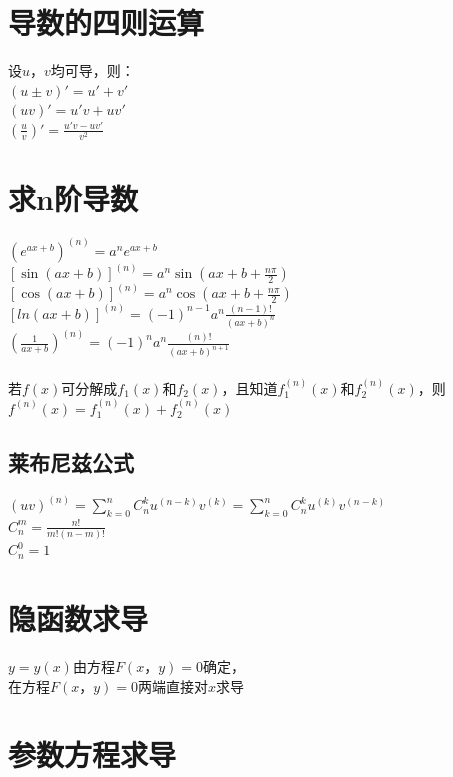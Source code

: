 \documentclass{article}
\begin{document}
\begin{flushleft}
	\section{导数的四则运算}
	
	设$u，v$均可导，则：\\
	$(u\pm v)'=u'+v'$\\
	$(uv)'=u'v+uv'$\\
	$(\frac{u}{v})'=\frac{u'v-uv'}{v^2}$\\
	
	\section{求n阶导数}
	
	$(e^{ax+b})^{(n)}=a^ne^{ax+b}$\\
	$[\sin(ax+b)]^{(n)}=a^n\sin(ax+b+\frac{n\pi}{2})$\\
	$[\cos(ax+b)]^{(n)}=a^n\cos(ax+b+\frac{n\pi}{2})$\\
	$[ln(ax+b)]^{(n)}=(-1)^{n-1}a^n\frac{(n-1)!}{(ax+b)^n}$\\
	$(\frac{1}{ax+b})^{(n)}=(-1)^{n}a^n\frac{(n)!}{(ax+b)^{n+1}}$\\
	~\\
	若$f(x)$可分解成$f_1(x)$和$f_2(x)$，且知道$f_1^{(n)}(x)$和$f_2^{(n)}(x)$，则$f^{(n)}(x)=f_1^{(n)}(x)+f_2^{(n)}(x)$\\

	\subsection{莱布尼兹公式}
	
	$(uv)^{(n)} = \sum\limits_{k=0}^{n} C_n^k u^{(n-k)} v^{(k)} = \sum\limits_{k=0}^{n} C_n^k u^{(k)} v^{(n-k)}$\\
	$C_n^m=\frac{n!}{m!(n-m)!}$\\
	$C_n^0=1$\\
	
	\section{隐函数求导}
	
	$y=y(x)$由方程$F(x，y)=0$确定，\\
	在方程$F(x，y)=0$两端直接对$x$求导\\
	
	\section{参数方程求导}
	

\end{flushleft}
\end{document}
